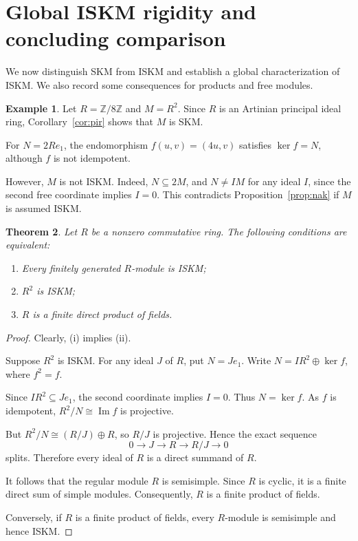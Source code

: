 \documentclass[11pt,a4paper]{article}
\newtheorem{theorem}{Theorem}[section]
\theoremstyle{definition}
\newtheorem{example}[theorem]{Example}
\theoremstyle{remark}
\begin{document}


\section{Global ISKM rigidity and concluding comparison}

We now distinguish SKM from ISKM and establish a global characterization of ISKM. We also record some consequences for products and free modules.

\begin{example}
Let $R=\mathbb Z/8\mathbb Z$ and $M=R^2$. Since $R$ is an Artinian principal ideal ring, Corollary~\ref{cor:pir} shows that $M$ is SKM.

For $N=2Re_1$, the endomorphism $f(u,v)=(4u,v)$ satisfies $\ker f=N$, although $f$ is not idempotent.

However, $M$ is not ISKM. Indeed, $N\subseteq2M$, and $N\ne IM$ for any ideal $I$, since the second free coordinate implies $I=0$. This contradicts Proposition~\ref{prop:nak} if $M$ is assumed ISKM.
\end{example}

\begin{theorem}
\label{thm:global}
Let $R$ be a nonzero commutative ring. The following conditions are equivalent:
\begin{enumerate}[label=\textup{(\roman*)}]
\item Every finitely generated $R$-module is ISKM;
\item $R^2$ is ISKM;
\item $R$ is a finite direct product of fields.
\end{enumerate}
\end{theorem}

\begin{proof}
Clearly, (i) implies (ii).

Suppose $R^2$ is ISKM. For any ideal $J$ of $R$, put $N=Je_1$. Write $N=IR^2\oplus\ker f$, where $f^2=f$.

Since $IR^2\subseteq Je_1$, the second coordinate implies $I=0$. Thus $N=\ker f$. As $f$ is idempotent, $R^2/N\cong\operatorname{Im}f$ is projective.

But $R^2/N\cong(R/J)\oplus R$, so $R/J$ is projective. Hence the exact sequence
\[
0\longrightarrow J\longrightarrow R
\longrightarrow R/J\longrightarrow0
\]
splits. Therefore every ideal of $R$ is a direct summand of $R$.

It follows that the regular module $R$ is semisimple. Since $R$ is cyclic, it is a finite direct sum of simple modules. Consequently, $R$ is a finite product of fields.

Conversely, if $R$ is a finite product of fields, every $R$-module is semisimple and hence ISKM.
\end{proof}
\end{document}
